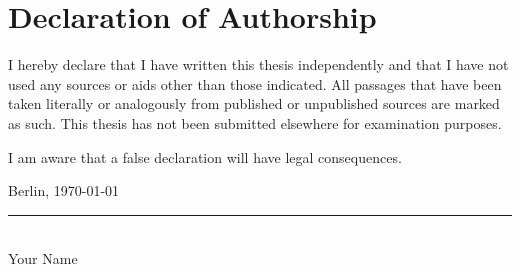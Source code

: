 
\chapter*{Declaration of Authorship}

I hereby declare that I have written this thesis independently and that I have not used any sources or aids other than those indicated. All passages that have been taken literally or analogously from published or unpublished sources are marked as such. This thesis has not been submitted elsewhere for examination purposes.

I am aware that a false declaration will have legal consequences.

\vspace{3cm}

\noindent Berlin, \today

\vspace{2cm}

\noindent\rule{6cm}{0.5pt}\\
Your Name

\cleardoublepage
